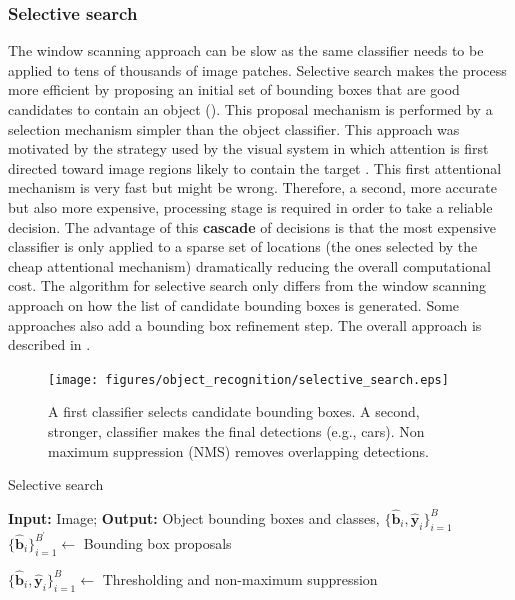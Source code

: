 \subsubsection{Selective search}
The window scanning approach can be slow as the same classifier needs to be applied to tens of thousands of image patches. Selective search makes the process more efficient by proposing an initial set of bounding boxes that are good candidates to contain an object (\fig{\ref{fig:selective_search_pipeline}}). This proposal mechanism is performed by a selection mechanism simpler than the object classifier.
This approach was motivated by the strategy used by the visual system in which attention is first directed toward image regions likely to contain the target \cite{wolfe2007,TreismanGelade1980,Koch_Ullman_1985}. This first attentional mechanism is very fast but might be wrong. Therefore, a second, more accurate but also more expensive, processing stage is required in order to take a reliable decision.  The advantage of this {\bf cascade} of decisions is that the most expensive classifier is only applied to a sparse set of locations (the ones selected by the cheap attentional mechanism) dramatically reducing the overall computational cost. The algorithm for selective search only differs from the window scanning approach on how the list of candidate bounding boxes is generated. Some approaches also add a bounding box refinement step.
The overall approach is described in \algref{\ref{alg:selective_search}}.

\begin{figure}[t]
    \centerline{
        \texttt{[image: figures/object\_recognition/selective\_search.eps]}
    }
    \caption{A first classifier selects candidate bounding boxes. A second, stronger, classifier makes the final detections (e.g., cars). Non maximum suppression (NMS) removes overlapping detections.}
    \label{fig:selective_search_pipeline}
\end{figure}


\begin{algorithm}[h]
    \SetAlgoVlined
    \DontPrintSemicolon
    \caption{Selective search}
    \faketablecaption{}
    \label{alg:selective_search}
    {\bf Input:} Image;
    {\bf Output:} Object bounding boxes and classes, $\{\hat{\mathbf{b}}_i, \hat{\mathbf{y}}_i\}_{i=1}^B$\;
    $\{\hat{\mathbf{b}}_i\}_{i=1}^{B^{\prime}} \leftarrow$ Bounding box proposals\;

    $\{\hat{\mathbf{b}}_i, \hat{\mathbf{y}}_i\}_{i=1}^B \leftarrow$ Thresholding and non-maximum suppression\;
\end{algorithm}

